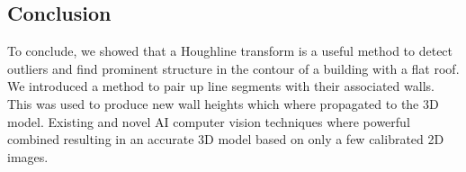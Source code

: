 \documentclass[10pt]{article}
\begin{document}
{%

\subsection{Conclusion}


To conclude, we showed that a Houghline transform is a useful method to detect outliers and find prominent structure in the contour of a building with a flat roof. We introduced a method to pair up line segments with their associated walls. This was used to produce new wall heights which where propagated to the 3D model.
Existing and novel AI computer vision techniques where powerful combined resulting in an accurate 3D model based on only a few calibrated 2D images. 

}
\end{document}
